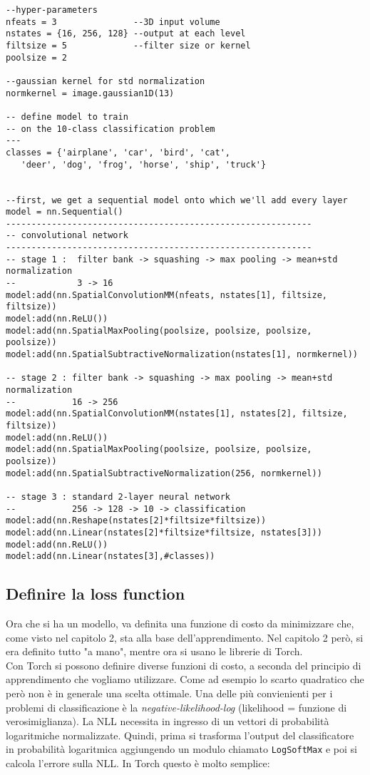 \begin{lstlisting}[language={[5.2]Lua}]
--hyper-parameters
nfeats = 3               --3D input volume
nstates = {16, 256, 128} --output at each level
filtsize = 5             --filter size or kernel
poolsize = 2

--gaussian kernel for std normalization 
normkernel = image.gaussian1D(13)

-- define model to train
-- on the 10-class classification problem
---
classes = {'airplane', 'car', 'bird', 'cat',
   'deer', 'dog', 'frog', 'horse', 'ship', 'truck'}


--first, we get a sequential model onto which we'll add every layer
model = nn.Sequential()
------------------------------------------------------------
-- convolutional network
------------------------------------------------------------
-- stage 1 :  filter bank -> squashing -> max pooling -> mean+std normalization
--            3 -> 16
model:add(nn.SpatialConvolutionMM(nfeats, nstates[1], filtsize, filtsize))
model:add(nn.ReLU())
model:add(nn.SpatialMaxPooling(poolsize, poolsize, poolsize, poolsize))
model:add(nn.SpatialSubtractiveNormalization(nstates[1], normkernel))

-- stage 2 : filter bank -> squashing -> max pooling -> mean+std normalization
--           16 -> 256
model:add(nn.SpatialConvolutionMM(nstates[1], nstates[2], filtsize, filtsize))
model:add(nn.ReLU())
model:add(nn.SpatialMaxPooling(poolsize, poolsize, poolsize, poolsize))
model:add(nn.SpatialSubtractiveNormalization(256, normkernel))

-- stage 3 : standard 2-layer neural network
--           256 -> 128 -> 10 -> classification
model:add(nn.Reshape(nstates[2]*filtsize*filtsize))
model:add(nn.Linear(nstates[2]*filtsize*filtsize, nstates[3]))
model:add(nn.ReLU())
model:add(nn.Linear(nstates[3],#classes))
\end{lstlisting}

\subsection{Definire la loss function}
Ora che si ha un modello, va definita una funzione di costo da minimizzare che, come visto nel capitolo 2, sta alla base dell’apprendimento. Nel capitolo 2 però, si era definito tutto "a mano", mentre ora si usano le librerie di Torch. \\Con Torch si possono definire diverse funzioni di costo, a seconda del principio di apprendimento che vogliamo utilizzare. Come ad esempio lo scarto quadratico che però non è in generale una scelta ottimale. Una delle più convienienti per i problemi di classificazione è la \emph{negative-likelihood-log} (likelihood = funzione di verosimiglianza). La NLL necessita in ingresso di un vettori di probabilità logaritmiche normalizzate. Quindi, prima si trasforma l’output del classificatore in probabilità logaritmica aggiungendo un modulo chiamato \texttt{LogSoftMax} e poi si calcola l'errore sulla NLL. In Torch questo è molto semplice: 

